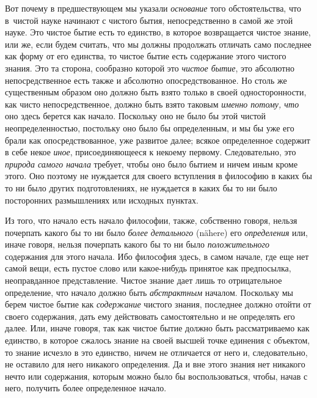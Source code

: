 Вот почему в предшествующем мы указали {\em основание} того обстоятельства, что
в~чистой науке начинают с чистого бытия, непосредственно в самой же этой науке.
Это чистое бытие есть то единство, в которое возвращается чистое знание, или
же, если будем считать, что мы должны продолжать отличать само последнее как
форму от его единства, то чистое бытие есть содержание этого чистого знания.
Это та сторона, сообразно которой это {\em чистое бытие}, это абсолютно
непосредственное есть также и абсолютно опосредствованное. Но столь же
существенным образом оно должно быть взято только в своей односторонности, как
чисто непосредственное, должно быть взято таковым {\em именно потому, что} оно
здесь берется как начало. Поскольку оно не было бы этой чистой
неопределенностью, постольку оно было бы определенным, и мы бы уже его брали
как опосредствованное, уже развитое далее; всякое определенное содержит в себе
некое {\em иное}, присоединяющееся к некоему первому. Следовательно, это
{\em природа самого начала} требует, чтобы оно было бытием и ничем иным кроме
этого. Оно поэтому не нуждается для своего вступления в философию в каких бы то
ни было других подготовлениях, не нуждается в каких бы то ни было посторонних
размышлениях или исходных пунктах.

Из того, что начало есть начало философии, также, собственно говоря, нельзя
почерпать какого бы то ни было {\em более детального} (nähere) его
{\em определения} или, иначе говоря, нельзя почерпать какого бы то ни было
{\em положительного} содержания для этого начала. Ибо философия здесь, в самом
начале, где еще нет самой вещи, есть пустое слово или какое-нибудь принятое как
предпосылка, неоправданное представление. Чистое знание дает лишь то
отрицательное определение, что начало должно быть {\em абстрактным} началом.
Поскольку мы берем чистое бытие как {\em содержание} чистого знания, последнее
должно отойти от своего содержания, дать ему действовать самостоятельно и не
определять его далее. Или, иначе говоря, так как чистое бытие должно быть
рассматриваемо как единство, в которое сжалось знание на своей высшей точке
единения с объектом, то знание исчезло в это единство, ничем не отличается от
него и, следовательно, не оставило для него никакого определения. Да и вне
этого знания нет никакого нечто или содержания, которым можно было бы
воспользоваться, чтобы, начав с него, получить более определенное начало.

